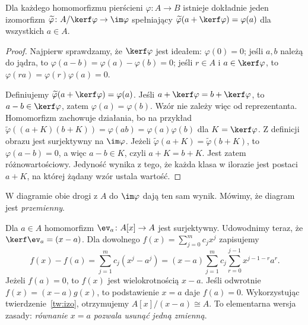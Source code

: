 \begin{twierdzenie}
\label{tw:izo}
Dla każdego homomorfizmu pierścieni $\varphi\colon A\to B$
istnieje dokładnie jeden izomorfizm
$\widetilde\varphi\colon A/\kerf\varphi\to\im\varphi$
spełniający $\widetilde\varphi(a+\kerf\varphi)=\varphi(a)$
dla wszystkich $a\in A$.
\end{twierdzenie}
\begin{proof}
Najpierw sprawdzamy, że $\kerf\varphi$ jest ideałem:
$\varphi(0)=0$; jeśli $a,b$ należą do jądra, to
$\varphi(a-b)=\varphi(a)-\varphi(b)=0$;
jeśli $r\in A$ i $a\in\kerf\varphi$, to
$\varphi(ra)=\varphi(r)\varphi(a)=0$.

Definiujemy $\widetilde\varphi(a+\kerf\varphi)=\varphi(a)$.
Jeśli $a+\kerf\varphi=b+\kerf\varphi$, to
$a-b\in\kerf\varphi$, zatem $\varphi(a)=\varphi(b)$.
Wzór nie zależy więc od reprezentanta. Homomorfizm zachowuje działania,
bo na przykład
$\widetilde\varphi((a+K)(b+K))=\varphi(ab)
=\varphi(a)\varphi(b)$ dla $K=\kerf\varphi$.
Z definicji obrazu jest surjektywny na $\im\varphi$.
Jeżeli $\widetilde\varphi(a+K)=\widetilde\varphi(b+K)$,
to $\varphi(a-b)=0$, a więc $a-b\in K$, czyli $a+K=b+K$.
Jest zatem różnowartościowy. Jedyność wynika z tego, że każda klasa
w ilorazie jest postaci $a+K$, na której żądany wzór ustala wartość.
\end{proof}

\begin{center}
\end{center}
W diagramie obie drogi z $A$ do $\im\varphi$ dają ten sam wynik.
Mówimy, że diagram jest \emph{przemienny}.

\begin{przyklad}
Dla $a\in A$ homomorfizm $\ev_a\colon A[x]\to A$ jest surjektywny.
Udowodnimy teraz, że $\kerf\ev_a=(x-a)$.
Dla dowolnego $f(x)=\sum_{j=0}^m c_jx^j$ zapisujemy
\[
 f(x)-f(a)=\sum_{j=1}^m c_j(x^j-a^j)
 =(x-a)\sum_{j=1}^m c_j\sum_{r=0}^{j-1}x^{j-1-r}a^r.
\]
Jeżeli $f(a)=0$, to $f(x)$ jest wielokrotnością $x-a$.
Jeśli odwrotnie $f(x)=(x-a)g(x)$, to podstawienie $x=a$ daje $f(a)=0$.
Wykorzystując twierdzenie~\ref{tw:izo}, otrzymujemy
$A[x]/(x-a)\cong A$.
To elementarna wersja zasady: \emph{równanie $x=a$ pozwala usunąć
jedną zmienną}.
\end{przyklad}

